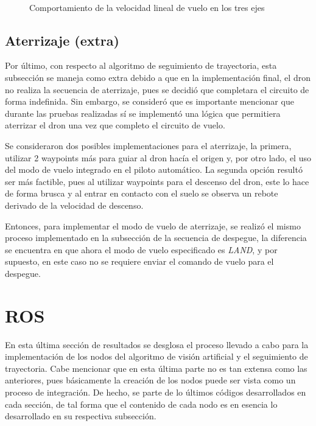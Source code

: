 \begin{figure}[ht]
    \centering
    \hfill
    \\
    \hfill

    \caption{Comportamiento de la velocidad lineal de vuelo en los tres ejes}
    \label{fig:pymav_missionv}
\end{figure}




\subsection{Aterrizaje (extra)}

Por último, con respecto al algoritmo de seguimiento de trayectoria, esta subsección se maneja como extra debido a que en la implementación final, el dron no realiza la secuencia de aterrizaje, pues se decidió que completara el circuito de forma indefinida. Sin embargo, se consideró que es importante mencionar que durante las pruebas realizadas sí se implementó una lógica que permitiera aterrizar el dron una vez que completo el circuito de vuelo. 

Se consideraron dos posibles implementaciones para el aterrizaje, la primera, utilizar 2 waypoints más para guiar al dron hacía el origen y, por otro lado, el uso del modo de vuelo integrado en el piloto automático. La segunda opción resultó ser más factible, pues al utilizar waypoints para el descenso del dron, este lo hace de forma brusca y al entrar en contacto con el suelo se observa un rebote derivado de la velocidad de descenso.

Entonces, para implementar el modo de vuelo de aterrizaje, se realizó el mismo proceso implementado en la subsección de la secuencia de despegue, la diferencia se encuentra en que ahora el modo de vuelo especificado es \textit{LAND}, y por supuesto, en este caso no se requiere enviar el comando de vuelo para el despegue.


\section{ROS}

En esta última sección de resultados se desglosa el proceso llevado a cabo para la implementación de los nodos del algoritmo de visión artificial y el seguimiento de trayectoria. Cabe mencionar que en esta última parte no es tan extensa como las anteriores, pues básicamente la creación de los nodos puede ser vista como un proceso de integración. De hecho, se parte de lo últimos códigos desarrollados en cada sección, de tal forma que el contenido de cada nodo es en esencia lo desarrollado en su respectiva subsección.

